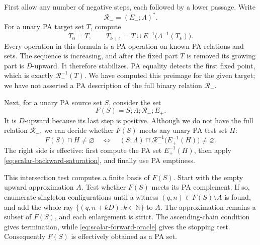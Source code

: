 \documentclass[11pt,a4paper]{article}
\theoremstyle{remark}
\newcommand{\N}{\mathbb N}
\begin{document}
First allow any number of negative steps, each followed by a lower
passage.  Write
\[
 \mathcal R_-=(E_-;\Lambda)^*.
\]
For a unary PA target set \(T\), compute
\begin{equation}
 T_0=T,\qquad
 T_{k+1}=T\cup E_-^{-1}\bigl(\Lambda^{-1}(T_k)\bigr).
 \label{eq:scalar-backward-saturation}
\end{equation}
Every operation in this formula is a PA operation on known PA
relations and sets.  The sequence is increasing, and after the fixed
part \(T\) is removed its growing part is \(D\)-upward.  It therefore
stabilizes.  PA equality detects the first fixed point, which is exactly
\(\mathcal R_-^{-1}(T)\).  We have computed this preimage for the
given target; we have not asserted a PA description of the full binary
relation \(\mathcal R_-\).

Next, for a unary PA source set \(S\), consider the set
\[
 F(S)=S;\Lambda;\mathcal R_-;E_+.
\]
It is \(D\)-upward because its last step is positive.  Although we do
not have the full relation \(\mathcal R_-\), we can decide whether
\(F(S)\) meets any unary PA test set \(H\):
\begin{equation}
 F(S)\cap H\neq\varnothing
 \quad\Longleftrightarrow\quad
 (S;\Lambda)\cap
 \mathcal R_-^{-1}\bigl(E_+^{-1}(H)\bigr)\neq\varnothing.
 \label{eq:scalar-forward-oracle}
\end{equation}
The right side is effective: first compute the PA set
\(E_+^{-1}(H)\), then apply
\eqref{eq:scalar-backward-saturation}, and finally use PA emptiness.

This intersection test computes a finite basis of \(F(S)\).
Start with the empty upward approximation \(A\).  Test whether
\(F(S)\) meets its PA complement.  If so, enumerate singleton
configurations until a witness \((q,n)\in F(S)\setminus A\) is
found, and add the whole ray \(\{(q,n+kD):k\in\N\}\) to \(A\).
The approximation remains a subset of \(F(S)\), and each enlargement
is strict.  The ascending-chain condition gives termination, while
\eqref{eq:scalar-forward-oracle} gives the stopping test.  Consequently
\(F(S)\) is effectively obtained as a PA set.
\end{document}
